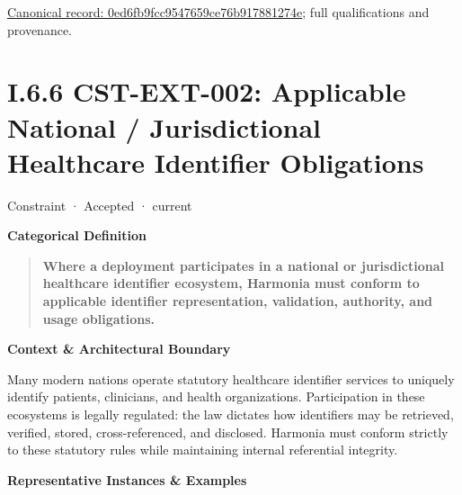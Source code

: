 {\footnotesize \href{../../../../../../../continuum/motivation/constraint/0ed6fb9fcc9547659ce76b917881274e.md}{Canonical record: 0ed6fb9fcc9547659ce76b917881274e}; full qualifications and provenance.}\par
\section*{I.6.6 CST-EXT-002: Applicable National / Jurisdictional Healthcare Identifier Obligations}
\label{navigation:I.6.6}

\label{element:edb1db6b18d84487ab48b9416f26e980}
{\small Constraint · Accepted · current}\par

\par\medskip\textbf{Categorical Definition}\par


\begin{quote}


\textbf{Where a deployment participates in a national or jurisdictional healthcare identifier ecosystem, Harmonia must conform to applicable identifier representation, validation, authority, and usage obligations.}



\end{quote}


\par\medskip\textbf{Context \& Architectural Boundary}\par


Many modern nations operate statutory healthcare identifier services to uniquely identify patients, clinicians, and health organizations. Participation in these ecosystems is legally regulated: the law dictates how identifiers may be retrieved, verified, stored, cross-referenced, and disclosed. Harmonia must conform strictly to these statutory rules while maintaining internal referential integrity.



\par\medskip\textbf{Representative Instances \& Examples}\par


